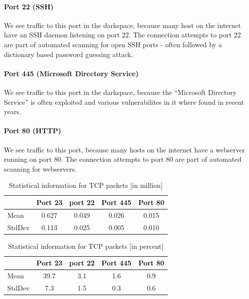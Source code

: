 \documentclass{article}
\begin{document}
\paragraph{Port 22 (SSH)}
We see traffic to this port in the darkspace, because many host on the internet have an
SSH daemon listening on port 22. The connection attempts to port 22 are part of automated scanning
for open SSH ports - often followed by a dictionary based password guessing attack.

\paragraph{Port 445 (Microsoft Directory Service)}
We see traffic to this port in the darkspace, because the ``Microsoft Directory Service'' is often
exploited and various vulnerabilites in it where found in recent years.

\paragraph{Port 80 (HTTP)}
We see traffic to this port, because many hosts on the internet have a webserver running
on port 80. The connection attempts to port 80 are part of automated scanning for webservers.

\begin{table}[H]
    \centering
    \begin{tabular}{l|cccc}
        & Port 23 & port 22 & Port  445 & Port 80 \\
        \hline
        Mean &  0.627 & 0.049 & 0.026 & 0.015 \\
        StdDev &  0.113 & 0.025 & 0.005 & 0.010 \\
    \end{tabular}
    \caption{\label{table:rep-19-absolute} Statistical information for TCP packets [in million]}
\end{table}

\begin{table}[H]
    \centering
    \begin{tabular}{l|cccc}
        & Port 23 & port 22 & Port  445 & Port 80 \\
        \hline
        Mean &   39.7 & 3.1 & 1.6 & 0.9  \\
        StdDev & 7.3  & 1.5 & 0.3 & 0.6   \\
    \end{tabular}
    \caption{\label{table:rep-19-percentage} Statistical information for TCP packets [in percent]}
\end{table}
\end{document}
